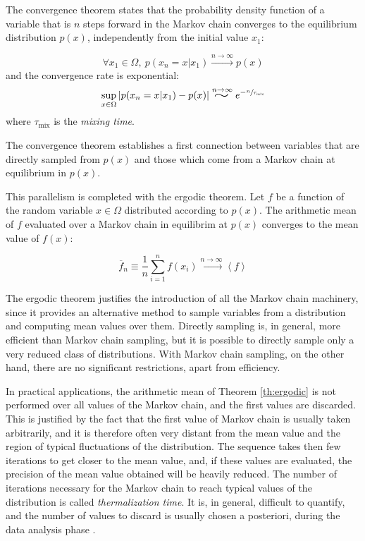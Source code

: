 The convergence theorem states that the probability density function of a variable that is $n$ steps forward in the Markov chain
converges to the equilibrium distribution $p(x)$, independently from the initial value $x_1$:
\begin{theorem}\label{th:convergence}
    \[
        \forall x_1 \in \Omega,\ p(x_{n}=x|x_1) \xrightarrow{n\to\infty} p(x)
    \]
    and the convergence rate is exponential:
    \[
        \sup_{x\in\Omega} |p(x_n=x|x_1) - p(x)| \stackrel{n\to\infty}{\scalebox{2}[1.25]{$\sim$}} e^{-\sfrac{n}{\tau_\mathrm{mix}}}
    \]
    where $\tau_\mathrm{mix}$ is the \emph{mixing time}.
\end{theorem}

The convergence theorem establishes a first connection between variables that are directly sampled from $p(x)$
and those which come from a Markov chain at equilibrium in $p(x)$.

This parallelism is completed with the ergodic theorem.
Let $f$ be a function of the random variable $x\in\Omega$ distributed according to $p(x)$.
The arithmetic mean of $f$ evaluated over a Markov chain in equilibrim at $p(x)$ converges to the mean value of $f(x)$:
\begin{theorem}\label{th:ergodic}
    \[
        \overline f_n \equiv \frac{1}{n}\sum_{i=1}^n f(x_i) \xrightarrow{n\to\infty} \left<f\right>
    \]
\end{theorem}

The ergodic theorem justifies the introduction of all the Markov chain machinery,
since it provides an alternative method to sample variables from a distribution and computing mean values over them.
Directly sampling is, in general, more efficient than Markov chain sampling,
but it is possible to directly sample only a very reduced class of distributions.
With Markov chain sampling, on the other hand, there are no significant restrictions, apart from efficiency.

In practical applications, the arithmetic mean of Theorem \ref{th:ergodic} is not performed over all values of the Markov chain,
and the first values are discarded.
This is justified by the fact that the first value of Markov chain is usually taken arbitrarily,
and it is therefore often very distant from the mean value and the region of typical fluctuations of the distribution.
The sequence takes then few iterations to get closer to the mean value, and, if these values are evaluated,
the precision of the mean value obtained will be heavily reduced.
The number of iterations necessary for the Markov chain to reach typical values of the distribution is called \emph{thermalization time}.
It is, in general, difficult to quantify, and the number of values to discard is usually chosen a posteriori, during the data analysis phase \cite{numerical_recipes}.


